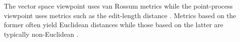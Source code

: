 The vector space viewpoint uses van Rossum metrics while the point-process viewpoint
uses metrics such as the edit-length distance \cite{Victor2005}. 
Metrics based on the former often yield  Euclidean distances while those based on the latter are typically non-Euclidean \cite{Aronov2004}.\\



































%






